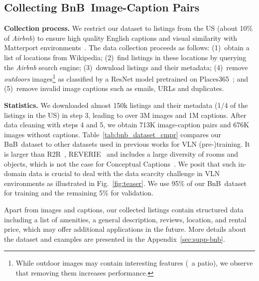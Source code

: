 \RequirePackage[dvipsnames,table]{xcolor} \documentclass[10pt,twocolumn,letterpaper]{article}
\newcommand{\p}[1]{\vspace{1mm}\noindent\textbf{#1}}
\newcommand{\airbnb}{BnB}
\begin{document}
\subsection{Collecting \airbnb~Image-Caption Pairs}
\p{Collection process.}
We restrict our dataset to listings from the US (about 10\% of \emph{Airbnb}) to ensure high quality English captions and visual similarity with Matterport environments~\cite{Matterport3D}.
The data collection proceeds as follows: 
(1)~obtain a list of locations from Wikipedia; 
(2)~find listings in these locations by querying the \emph{Airbnb} search engine; 
(3)~download listings and their metadata; 
(4)~remove \emph{outdoors} images\footnote{While outdoor images may contain interesting features (\eg~a patio), we observe that removing them increases performance.} as classified by a ResNet model pretrained on Places365~\cite{zhou2017places}; and
(5)~remove invalid image captions such as emails, URLs and duplicates.

\p{Statistics.}
We downloaded almost 150k listings and their metadata (1/4 of the listings in the US) in step 3, leading to over 3M images and 1M captions.
After data cleaning with steps 4 and 5, we obtain 713K image-caption pairs and 676K images without captions.
Table~\ref{tab:bnb_dataset_cmpr} compares our \airbnb~dataset to other datasets used in previous works for VLN (pre-)training.
It is larger than R2R~\cite{anderson2018r2r}, REVERIE~\cite{qi2020reverie} and includes a large diversity of rooms and objects, which is not the case for Conceptual Captions~\cite{ConceptualCaptions}. 
We posit that such in-domain data is crucial to deal with the data scarcity challenge in VLN environments as illustrated in Fig.~\ref{fig:teaser}.
We use 95\% of our \airbnb~dataset for training and the remaining 5\% for validation.

Apart from images and captions, our collected listings contain structured data including a list of amenities, a general description, reviews, location, and rental price, which may offer additional applications in the future.
More details about the dataset and examples are presented in the Appendix~\ref{sec:supp-bnb}. 
\end{document}
